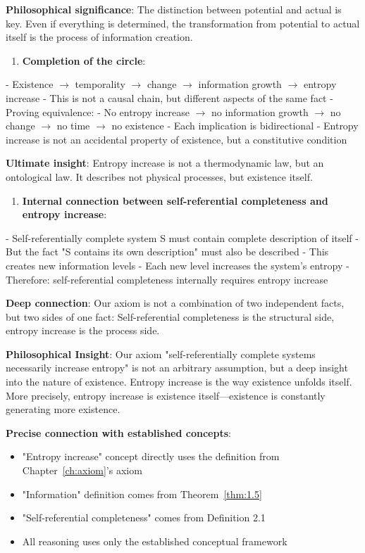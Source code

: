    \textbf{Philosophical significance}: The distinction between potential and actual is key.
   Even if everything is determined, the transformation from potential to actual
   itself is the process of information creation.

\begin{enumerate}
\item \textbf{Completion of the circle}:
\end{enumerate}
   - Existence $\rightarrow$ temporality $\rightarrow$ change $\rightarrow$ information growth $\rightarrow$ entropy increase
   - This is not a causal chain, but different aspects of the same fact
   - Proving equivalence:
     - No entropy increase $\rightarrow$ no information growth $\rightarrow$ no change $\rightarrow$ no time $\rightarrow$ no existence
     - Each implication is bidirectional
   - Entropy increase is not an accidental property of existence, but a constitutive condition
   
   \textbf{Ultimate insight}: Entropy increase is not a thermodynamic law,
   but an ontological law.
   It describes not physical processes, but existence itself.

\begin{enumerate}
\item \textbf{Internal connection between self-referential completeness and entropy increase}:
\end{enumerate}
   - Self-referentially complete system S must contain complete description of itself
   - But the fact "S contains its own description" must also be described
   - This creates new information levels
   - Each new level increases the system's entropy
   - Therefore: self-referential completeness internally requires entropy increase
   
   \textbf{Deep connection}: Our axiom is not a combination of two independent facts,
   but two sides of one fact:
   Self-referential completeness is the structural side, entropy increase is the process side.

\textbf{Philosophical Insight}:
Our axiom "self-referentially complete systems necessarily increase entropy" is not an arbitrary assumption,
but a deep insight into the nature of existence. Entropy increase is the way existence unfolds itself.
More precisely, entropy increase is existence itself---existence is constantly generating more existence.

\textbf{Precise connection with established concepts}:
\begin{itemize}
\item "Entropy increase" concept directly uses the definition from Chapter~\ref{ch:axiom}'s axiom
\item "Information" definition comes from Theorem~\ref{thm:1.5}
\item "Self-referential completeness" comes from Definition 2.1
\item All reasoning uses only the established conceptual framework
\end{itemize}

